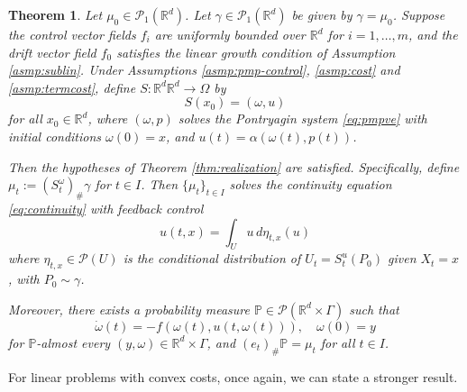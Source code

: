 \documentclass{article}
\newtheorem{theorem}{Theorem}[section]
\newcommand{\Rd}{\mathbb{R}^d}
\begin{document}
\begin{theorem}
\label{thm:pmp-flow2}
Let $\mu_0 \in \mathcal{P}_1(\Rd)$. Let $\gamma \in \mathcal{P}_1(\Rd )$ be given by $\gamma = \mu_0$. Suppose the control vector fields $f_i$ are uniformly bounded over $\mathbb{R}^d$ for $i = 1,\ldots,m$, and the drift vector field $f_0$ satisfies the linear growth condition of Assumption \ref{asmp:sublin}. Under Assumptions \ref{asmp:pmp-control},  \ref{asmp:cost} and \ref{asmp:termcost}, define $S: \mathbb{R}^d \Rd \rightarrow \Omega$ by  
\[S(x_0) = (\omega,u)\] 
for all $x_0 \in \mathbb{R}^d$, where $(\omega,p)$ solves the Pontryagin system \eqref{eq:pmpve} with initial conditions $\omega(0) = x$, and $u(t) = \alpha(\omega(t),p(t))$.

Then the hypotheses of Theorem \ref{thm:realization} are satisfied. Specifically, define $\mu_t := (S^{\omega}_t)_{\#}\gamma$ for $t \in I$. Then $\{\mu_t\}_{t \in I}$ solves the continuity equation \eqref{eq:continuity} with feedback control
\[u(t,x) = \int_{U} u \, d\eta_{t,x}(u)\]
where $\eta_{t,x} \in \mathcal{P}(U)$ is the conditional distribution of $U_t = S^u_t(P_0)$ given $X_t = x$, with $P_0 \sim \gamma$.

Moreover, there exists a probability measure $\mathbb{P} \in \mathcal{P}(\mathbb{R}^d \times \Gamma)$ such that 
\begin{equation}
\label{eq:reverse-flow}
\dot{\omega}(t) = -f(\omega(t), u(t,\omega(t))), \quad \omega(0) = y
\end{equation}
for $\mathbb{P}$-almost every $(y,\omega) \in \mathbb{R}^d \times \Gamma$, and $(e_t)_{\#}\mathbb{P} = \mu_t$ for all $t \in I$.
\end{theorem}

For linear problems with convex costs, once again, we can state a stronger result.
\end{document}
